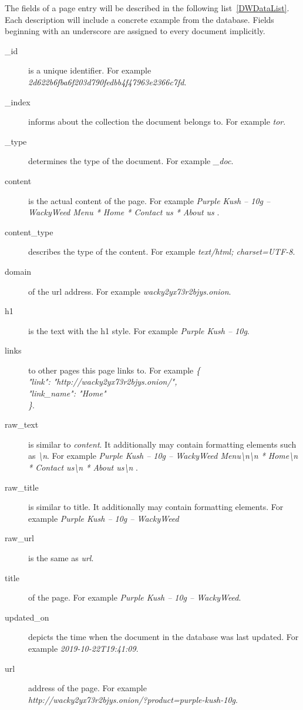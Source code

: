 The fields of a page entry will be described in the following list~\ref{DWDataList}. Each description will include a concrete example from the database. Fields beginning with an underscore are assigned to every document implicitly.
 \label{DWDataList}
\begin {description}
	\item[\_id] is a unique identifier. For example\\ \textit{2d622b6fba6f203d790fedbb4f47963e2366c7fd}.
	\item[\_index] informs about the collection the document belongs to. For example \textit{tor}. 
	\item[\_type] determines the type of the document. For example \textit{\_doc}.
	\item[content] is the actual content of the page. For example \textit{Purple Kush – 10g – WackyWeed Menu    * Home   * Contact us   * About us }.
	\item[content\_type] describes the type of the content. For example \textit{text/html; charset=UTF-8}.
	\item[domain] of the url address. For example \textit{wacky2yx73r2bjys.onion}.
	\item[h1] is the text with the h1 style. For example \textit{Purple Kush – 10g}.
	\item[links] to other pages this page links to. For example \textit{\{\\
  "link": "http://wacky2yx73r2bjys.onion/",\\
  "link\_name": "Home"\\
\}}.
	\item[raw\_text] is similar to \textit{content}. It additionally may contain formatting elements such as \textit{\textbackslash n}. For example \textit{Purple Kush – 10g – WackyWeed Menu\textbackslash n\textbackslash n  * Home\textbackslash n  * Contact us\textbackslash n  * About us\textbackslash n }.
	\item[raw\_title] is similar to title. It additionally may contain formatting elements. For example \textit{Purple Kush – 10g – WackyWeed}
	\item[raw\_url] is the same as \textit{url}.
	\item[title] of the page. For example \textit{Purple Kush – 10g – WackyWeed}.
	\item[updated\_on] depicts the time when the document in the database was last updated. For example \textit{2019-10-22T19:41:09}.
	\item[url] address of the page. For example \\ \textit{http://wacky2yx73r2bjys.onion/?product=purple-kush-10g}.
\end{description}